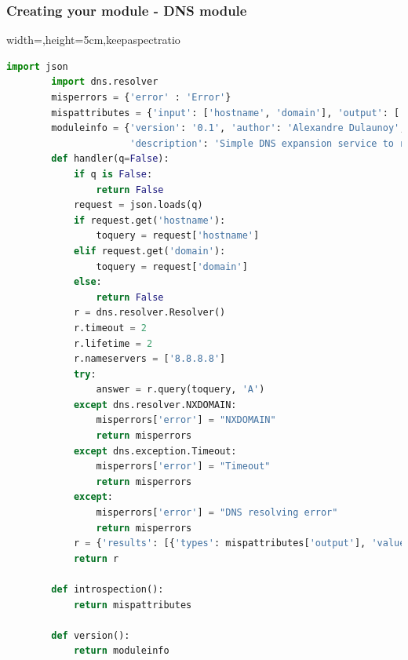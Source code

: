  \begin{frame}[fragile]
      \frametitle{Creating your module - DNS module}
      \begin{adjustbox}{width=\textwidth,height=5cm,keepaspectratio}
      \begin{lstlisting}[language=python]
        import json
        import dns.resolver
        misperrors = {'error' : 'Error'}
        mispattributes = {'input': ['hostname', 'domain'], 'output': ['ip-src', 'ip-dst']}
        moduleinfo = {'version': '0.1', 'author': 'Alexandre Dulaunoy',
                      'description': 'Simple DNS expansion service to resolve IP address from MISP attributes', 'module-type': ['expansion','hover']}
        def handler(q=False):
            if q is False:
                return False
            request = json.loads(q)
            if request.get('hostname'):
                toquery = request['hostname']
            elif request.get('domain'):
                toquery = request['domain']
            else:
                return False
            r = dns.resolver.Resolver()
            r.timeout = 2
            r.lifetime = 2
            r.nameservers = ['8.8.8.8']
            try:
                answer = r.query(toquery, 'A')
            except dns.resolver.NXDOMAIN:
                misperrors['error'] = "NXDOMAIN"
                return misperrors
            except dns.exception.Timeout:
                misperrors['error'] = "Timeout"
                return misperrors
            except:
                misperrors['error'] = "DNS resolving error"
                return misperrors
            r = {'results': [{'types': mispattributes['output'], 'values':[str(answer[0])]}]}
            return r

        def introspection():
            return mispattributes

        def version():
            return moduleinfo
              \end{lstlisting}
        \end{adjustbox}
\end{frame}

